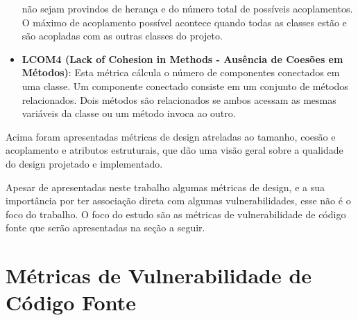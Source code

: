 \begin{itemize}
    não sejam provindos de herança e do número total de possíveis acoplamentos. O máximo de acoplamento possível acontece 
    quando todas as classes estão e são acopladas com as outras classes do projeto.
  \item \textbf{LCOM4 (Lack of Cohesion in Methods - Ausência de Coesões em Métodos)}: Esta métrica cálcula o número de 
    componentes conectados em uma classe. Um componente conectado consiste em um conjunto de métodos relacionados. Dois
    métodos são relacionados se ambos acessam as mesmas variáveis da classe ou um método invoca ao outro.
\end{itemize}

Acima foram apresentadas métricas de design atreladas ao tamanho, coesão e acoplamento e atributos estruturais, que dão uma
visão geral sobre a qualidade do design projetado e implementado.

Apesar de apresentadas neste trabalho algumas métricas de design, e a sua importância por ter associação direta com algumas 
vulnerabilidades, esse não é o foco do trabalho. O foco do estudo são as métricas de vulnerabilidade de código fonte que serão 
apresentadas na seção a seguir.

\section{Métricas de Vulnerabilidade de Código Fonte}

